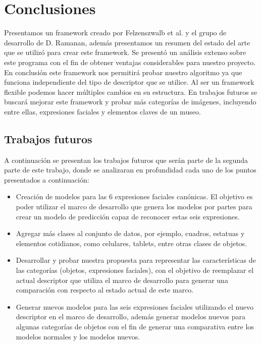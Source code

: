 \chapter[Conclusiones]{Conclusiones}\label{ch:capitulo6}
Presentamos un framework creado por Felzenszwalb et al. y el grupo de desarrollo de D. Ramanan, además presentamos un resumen del estado del arte que se utilizó para crear este framework. Se presentó un análisis extenso sobre este programa con el fin de obtener ventajas considerables para nuestro proyecto. En conclusión este framework nos permitirá probar nuestro algoritmo ya que funciona independiente del tipo de descriptor que se utilice. Al ser un framework flexible podemos hacer múltiples cambios en su estructura. En trabajos futuros se buscará mejorar este framework y probar más categorías de imágenes, incluyendo entre ellas, expresiones faciales y elementos claves de un museo.

\section{Trabajos futuros}
A continuación se presentan los trabajos futuros que serán parte de la segunda parte de este trabajo, donde se analizaran en profundidad cada uno de los puntos presentados a continuación:
\begin{itemize}

\item Creación de modelos para las 6 expresiones faciales canónicas. El objetivo es poder utilizar el marco de desarrollo que genera los modelos por partes para crear un modelo de predicción capaz de reconocer estas seis expresiones.

\item Agregar más clases al conjunto de datos, por ejemplo, cuadros, estatuas y elementos cotidianos, como celulares, tablets, entre otras clases de objetos.

\item Desarrollar y probar nuestra propuesta para representar las características de las categorías (objetos, expresiones faciales), con el objetivo de reemplazar el actual descriptor que utiliza el marco de desarrollo para generar una comparación con respecto al estado actual de este marco.

\item Generar nuevos modelos para las seis expresiones faciales utilizando el nuevo descriptor en el marco de desarrollo, además generar modelos nuevos para algunas categorías de objetos con el fin de generar una comparativa entre los modelos normales y los modelos nuevos.

\end{itemize}